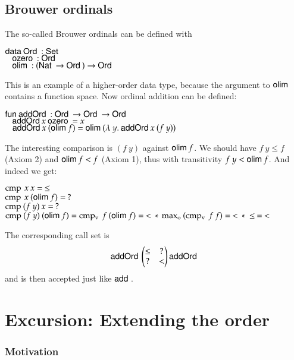\subsection{Brouwer ordinals}
The so-called Brouwer ordinals can be defined with
\begin{bsp}
$\mathsf{data}\: \mathsf{Ord}\: : \mathsf{Set}$ \\
$\hspace*{3mm} \mathsf{ozero}\: : \mathsf{Ord}\: $\\
$\hspace*{3mm} \mathsf{olim}\: : (\mathsf{Nat}\: \rightarrow \mathsf{Ord}\: ) \rightarrow \mathsf{Ord}\: $
\end{bsp}
This is an example of a higher-order data type, because the argument to $\mathsf{olim}\:$ contains a function space.
Now ordinal addition can be defined:
\begin{bsp}
$\mathsf{fun}\: \mathsf{addOrd}\: : \mathsf{Ord}\: \rightarrow \mathsf{Ord}\: \rightarrow \mathsf{Ord}\:$\\
$\hspace*{3mm} \mathsf{addOrd}\: x \: \mathsf{ozero}\: = x $\\
$\hspace*{3mm} \mathsf{addOrd}\: x \: (\mathsf{olim}\: f) = \mathsf{olim}\: ( \lambda\: y .\: \mathsf{addOrd}\:  x \: (f \: y))  $
\end{bsp}
The interesting comparison is $(f \: y)$ against $\mathsf{olim}\: f$.
We should have $f \: y \leq f$ (Axiom 2) and $\mathsf{olim}\: f < f $ (Axiom 1), thus with transitivity $ f\: y < \mathsf{olim}\: f$.
And indeed we get:
\begin{bsp}
$\operatorname{cmp} \: x \: x = \: \leq $\\
$\operatorname{cmp} \: x \: (\mathsf{olim}\: f) = \: ? $\\
$\operatorname{cmp} \: (f \: y) \: x = \: ? $\\
$\operatorname{cmp} \: (f \: y) \: (\mathsf{olim}\: f) = \operatorname{cmp_v} \: f \: (\mathsf{olim}\: f) = \: < \: * \: \operatorname{max_o} \: (\operatorname{cmp_v} \: f \: f) = \: < \: * \: \leq \: = \: < $ 
\end{bsp}
The corresponding call set is
\[
\mathsf{addOrd}\:\begin{pmatrix}
\leq & ? \\
?    & < \\
\end{pmatrix}\mathsf{addOrd}\:
\]
and is then accepted just like $\mathsf{add}\:$.
\section{Excursion: Extending the order}

\subsubsection{Motivation}

